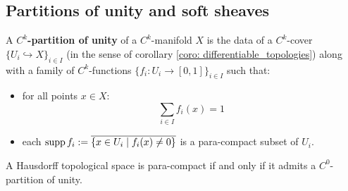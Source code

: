     \subsection{Partitions of unity and soft sheaves}
        \begin{definition} \label{def: partitions_of_unity}
            A \textbf{$C^k$-partition of unity} of a $C^k$-manifold $X$ is the data of a $C^k$-cover $\{U_i \hookrightarrow X\}_{i \in I}$ (in the sense of corollary \ref{coro: differentiable_topologies}) along with a family of $C^k$-functions $\{f_i: U_i \to [0, 1]\}_{i \in I}$ such that:
            \begin{itemize}
                \item for all points $x \in X$:
                    $$\sum_{i \in I} f_i(x) = 1$$
                \item each $\operatorname{supp} f_i := \overline{ \{ x \in U_i \mid f_i(x) \not = 0 \} }$ is a para-compact subset of $U_i$.
            \end{itemize}
        \end{definition}
        \begin{lemma} \label{lemma: para_compact_spaces_have_partitions_of_unity}
            A Hausdorff topological space is para-compact if and only if it admits a $C^0$-partition of unity. 
        \end{lemma}
